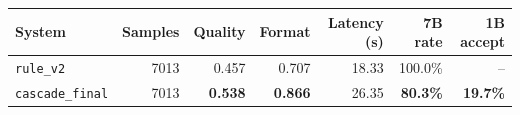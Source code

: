 \begin{tabular}{lrrrrrr}
\toprule
System & Samples & Quality & Format & Latency (s) & 7B rate & 1B accept \\
\midrule
\texttt{rule\_v2} & 7013 & 0.457 & 0.707 & 18.33 & 100.0\% & -- \\
\rowcolor{paceTealLight}
\texttt{cascade\_final} & 7013 & \textbf{0.538} & \textbf{0.866} & 26.35 & \textbf{80.3\%} & \textbf{19.7\%} \\
\bottomrule
\end{tabular}
